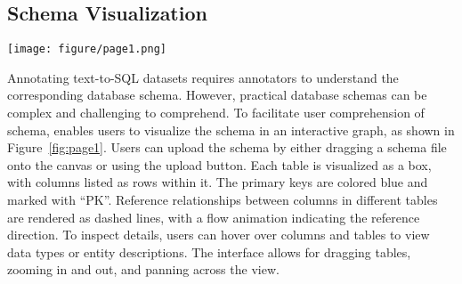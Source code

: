 \subsection{Schema Visualization}


\begin{figure*}[ht]
  \centering
  \texttt{[image: figure/page1.png]}
  \caption{The user interface for schema visualization. }
  \label{fig:page1}
\end{figure*}




Annotating text-to-SQL datasets requires annotators to understand the corresponding database schema. However, practical database schemas can be complex and challenging to comprehend. To facilitate user comprehension of schema, {\tool} enables users to visualize the schema in an interactive graph, as shown in Figure~\ref{fig:page1}.
Users can upload the schema by either dragging a schema file onto the canvas or using the upload button. Each table is visualized as a box, with columns listed as rows within it.
The primary keys are colored blue and marked with ``PK''. 
Reference relationships between columns in different tables are rendered as dashed lines, with a flow animation indicating the reference direction.
To inspect details, users can hover over columns and tables to view data types or entity descriptions. The interface allows for dragging tables, zooming in and out, and panning across the view.
 
